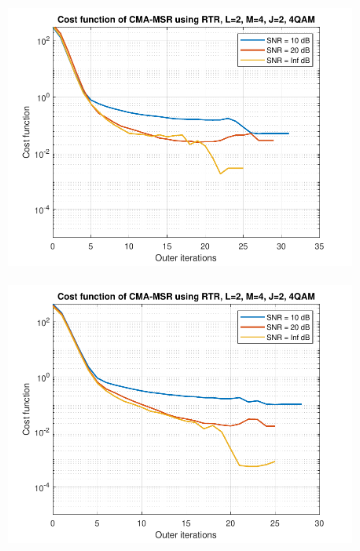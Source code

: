 \begin{figure}
	\centering
	\begin{subfigure}[b]{0.45\textwidth}
		\includegraphics[width=\linewidth]{./figs/BF_RTR_MSR_cost_4QAM_L=2_M=4_J=2_K=200.pdf}
		\label{fig:rtr_msr_cost200}
	\end{subfigure}
	\begin{subfigure}[b]{0.45\textwidth}
		\includegraphics[width=\linewidth]{./figs/BF_RTR_MSR_cost_4QAM_L=2_M=4_J=2_K=1000.pdf}
		\label{fig:rtr_msr_cost1000}
	\end{subfigure}\\
	\begin{subfigure}[b]{0.45\textwidth}

\end{subfigure}
\end{figure}
